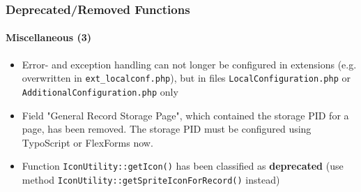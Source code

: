\begin{frame}[fragile]
	\frametitle{Deprecated/Removed Functions}
	\framesubtitle{Miscellaneous (3)}

	\begin{itemize}

		\item Error- and exception handling can not longer be configured in extensions (e.g. overwritten in
			\texttt{ext\_localconf.php}), but in files \texttt{LocalConfiguration.php} or
			\texttt{AdditionalConfiguration.php} only

		\item Field "General Record Storage Page", which contained the storage PID for a page, has been removed.
			The storage PID must be configured using TypoScript or FlexForms now.

		\item Function \texttt{IconUtility::getIcon()} has been classified as \textbf{deprecated} (use
			method \texttt{IconUtility::getSpriteIconForRecord()} instead)

	\end{itemize}

\end{frame}

